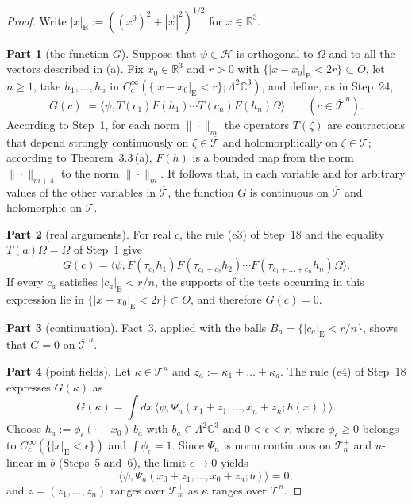 \documentclass[11pt]{amsart}
\theoremstyle{definition}
\begin{document}
\begin{proof}
Write $|x|_{\mathrm E}:=((x^0)^2+|\vec x|^2)^{1/2}$ for $x\in\mathbb R^3$.

\textbf{Part 1} (the function $G$).
Suppose that $\psi\in\mathcal H$ is orthogonal to $\Omega$ and to all the vectors described in (a).
Fix $x_0\in\mathbb R^3$ and $r>0$ with $\{|x-x_0|_{\mathrm E}<2r\}\subset O$, let $n\ge1$, take $h_1,\dots,h_n$ in $C_c^\infty(\{|x-x_0|_{\mathrm E}<r\};\Lambda^2\mathbb C^3)$, and define, as in Step~24,
\begin{equation*}
G(c):=\langle\psi,T(c_1)F(h_1)\cdots T(c_n)F(h_n)\Omega\rangle\qquad(c\in\overline{\mathcal T}^{\,n}).
\end{equation*}
According to Step~1, for each norm $\|\cdot\|_m$ the operators $T(\zeta)$ are contractions that depend strongly continuously on $\zeta\in\overline{\mathcal T}$ and holomorphically on $\zeta\in\mathcal T$; according to Theorem~3.3\,(a), $F(h)$ is a bounded map from the norm $\|\cdot\|_{m+4}$ to the norm $\|\cdot\|_m$.
It follows that, in each variable and for arbitrary values of the other variables in $\overline{\mathcal T}$, the function $G$ is continuous on $\overline{\mathcal T}$ and holomorphic on $\mathcal T$.

\textbf{Part 2} (real arguments).
For real $c$, the rule (e3) of Step~18 and the equality $T(a)\Omega=\Omega$ of Step~1 give
\begin{equation*}
G(c)=\langle\psi,F(\tau_{c_1}h_1)F(\tau_{c_1+c_2}h_2)\cdots F(\tau_{c_1+\dots+c_n}h_n)\Omega\rangle.
\end{equation*}
If every $c_a$ satisfies $|c_a|_{\mathrm E}<r/n$, the supports of the tests occurring in this expression lie in $\{|x-x_0|_{\mathrm E}<2r\}\subset O$, and therefore $G(c)=0$.

\textbf{Part 3} (continuation).
Fact~3, applied with the balls $B_a=\{|c_a|_{\mathrm E}<r/n\}$, shows that $G=0$ on $\overline{\mathcal T}^{\,n}$.

\textbf{Part 4} (point fields).
Let $\kappa\in\mathcal T^n$ and $z_a:=\kappa_1+\dots+\kappa_a$.
The rule (e4) of Step~18 expresses $G(\kappa)$ as
\begin{equation*}
G(\kappa)=\int dx\,\langle\psi,\Psi_n(x_1+z_1,\dots,x_n+z_n;h(x))\rangle.
\end{equation*}
Choose $h_a:=\phi_\epsilon(\cdot-x_0)\,b_a$ with $b_a\in\Lambda^2\mathbb C^3$ and $0<\epsilon<r$, where $\phi_\epsilon\ge0$ belongs to $C_c^\infty(\{|x|_{\mathrm E}<\epsilon\})$ and $\int\phi_\epsilon=1$.
Since $\Psi_n$ is norm continuous on $\mathcal T_n^+$ and $n$-linear in $b$ (Steps~5 and~6), the limit $\epsilon\to0$ yields
\begin{equation*}
\langle\psi,\Psi_n(x_0+z_1,\dots,x_0+z_n;b)\rangle=0,
\end{equation*}
and $z=(z_1,\dots,z_n)$ ranges over $\mathcal T_n^+$ as $\kappa$ ranges over $\mathcal T^n$.


\end{proof}
\end{document}
